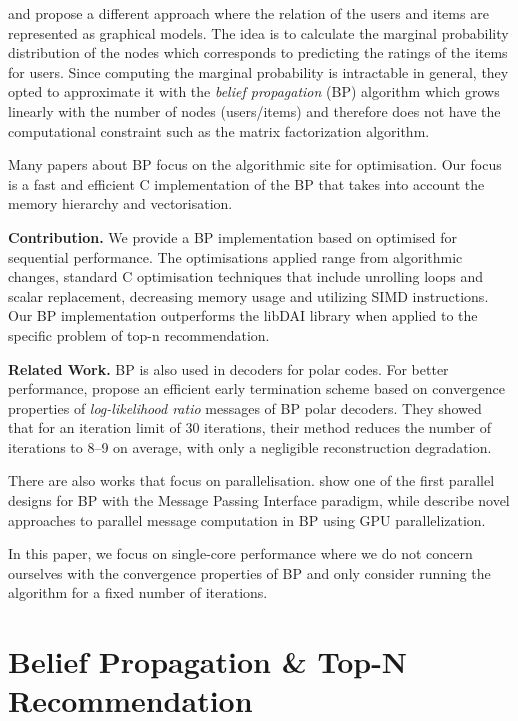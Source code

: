 \documentclass[letterpaper]{article}
\newcommand{\mypar}[1]{{\bf #1.}}
\begin{document}
\citet{BPRS} and \citet{top-n-recommendation} propose a different approach where the relation of the users and items are represented as graphical models. The idea is to calculate the marginal probability distribution of the nodes which corresponds to predicting the ratings of the items for users. Since computing the marginal probability is intractable in general, they opted to approximate it with the \emph{belief propagation} (BP) algorithm which grows linearly with the number of nodes (users/items) and therefore does not have the computational constraint such as the matrix factorization algorithm.

Many papers about BP focus on the algorithmic site for optimisation. Our focus is a fast and efficient C implementation of the BP that takes into account the memory hierarchy and vectorisation.

\mypar{Contribution}
We provide a BP implementation based on \citet{top-n-recommendation} optimised for sequential performance. The optimisations applied range from algorithmic changes, standard C optimisation techniques that include unrolling loops and scalar replacement, decreasing memory usage and utilizing SIMD instructions. Our BP implementation outperforms the libDAI library \cite{libdai} when applied to the specific problem of top-n recommendation. 

\mypar{Related Work}
BP is also used in decoders for polar codes. For better performance, \citet{related1} propose an efficient early termination scheme based on convergence properties of \emph{log-likelihood ratio} messages of BP polar decoders. They showed that for an iteration limit of 30 iterations, their method reduces the number of iterations to 8--9 on average, with only a negligible reconstruction degradation.

There are also works that focus on parallelisation. \citet{related2} show one of the first parallel designs for BP with the Message Passing Interface paradigm, while \citet{related3} describe novel approaches to parallel message computation in BP using GPU parallelization.

In this paper, we focus on single-core performance where we do not concern ourselves with the convergence properties of BP and only consider running the algorithm for a fixed number of iterations.

\section{Belief Propagation \& Top-N Recommendation}\label{sec:background}
\end{document}

